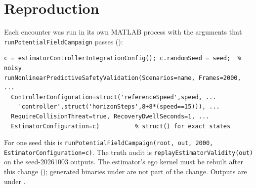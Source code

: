 \documentclass[11pt]{article}
\begin{document}
\section{Reproduction}
Each encounter was run in its own MATLAB process with the arguments that
\texttt{runPotentialFieldCampaign} passes
():
\begin{verbatim}
c = estimatorControllerIntegrationConfig(); c.randomSeed = seed;  % noisy
runNonlinearPredictiveSafetyValidation(Scenarios=name, Frames=2000, ...
  ControllerConfiguration=struct('referenceSpeed',speed, ...
    'controller',struct('horizonSteps',8+8*(speed==15))), ...
  RequireCollisionThreat=true, RecoveryDwellSeconds=1, ...
  EstimatorConfiguration=c)          % struct() for exact states
\end{verbatim}
For one seed this is \texttt{runPotentialFieldCampaign(root, out, 2000,
EstimatorConfiguration=c)}. The truth audit is
\texttt{replayEstimatorValidity(out)} on the seed-20261003 outputs. The
estimator's ego kernel must be rebuilt after this change
(); generated binaries under
 are not part of the change. Outputs are under
.
\end{document}
